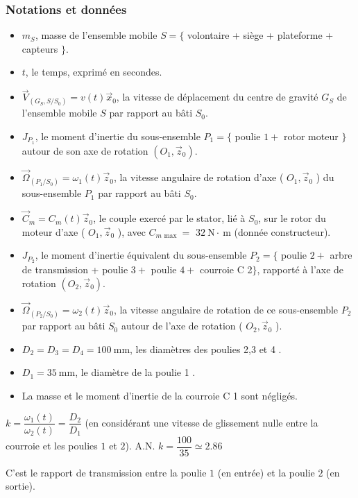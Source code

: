 \subsubsection*{Notations et données}
\begin{itemize}
  \item $m_{S}$, masse de l'ensemble mobile $S=\{$ volontaire + siège + plateforme + capteurs $\}$.
  \item $t$, le temps, exprimé en secondes.
  \item $\vec{V}_{\left(G_{S}, S / S_{0}\right)}=v(t) \vec{x}_{0}$, la vitesse de déplacement du centre de gravité $G_{S}$ de l'ensemble mobile $S$ par rapport au bâti $S_{0}$.
  \item $J_{P_{1}}$, le moment d'inertie du sous-ensemble $P_{1}=\{$ poulie $1+$ rotor moteur $\}$ autour de son axe de rotation $\left(O_{1}, \vec{z}_{0}\right)$.
  \item $\vec{\Omega}_{\left(P_{1} / S_{0}\right)}=\omega_{1}(t) \vec{z}_{0}$, la vitesse angulaire de rotation d'axe ( $O_{1}, \vec{z}_{0}$ ) du sous-ensemble $P_{1}$ par rapport au bâti $S_{0}$.
  \item $\vec{C}_{m}=C_{m}(t) \vec{z}_{0}$, le couple exercé par le stator, lié à $S_{0}$, sur le rotor du moteur d'axe ( $O_{1}, \vec{z}_{0}$ ), avec $C_{m \text { max }}=$ $32 \mathrm{~N} \cdot \mathrm{~m}$ (donnée constructeur).
  \item $J_{P_{2}}$, le moment d'inertie équivalent du sous-ensemble $P_{2}=\{$ poulie $2+$ arbre de transmission + poulie $3+$ poulie $4+$ courroie C 2$\}$, rapporté à l'axe de rotation $\left(O_{2}, \vec{z}_{0}\right)$.
  \item $\vec{\Omega}_{\left(P_{2} / S_{0}\right)}=\omega_{2}(t) \vec{z}_{0}$, la vitesse angulaire de rotation de ce sous-ensemble $P_{2}$ par rapport au bâti $S_{0}$ autour de l'axe de rotation ( $O_{2}, \vec{z}_{0}$ ).
  \item $D_{2}=D_{3}=D_{4}=100 \mathrm{~mm}$, les diamètres des poulies 2,3 et 4 .
  \item $D_{1}=35 \mathrm{~mm}$, le diamètre de la poulie 1 .
  \item La masse et le moment d'inertie de la courroie C 1 sont négligés.
\end{itemize}
\fi

\ifprof
\begin{corrige}
$ k = \dfrac{\omega_1(t)}{\omega_2(t)} = \dfrac{D_2}{D_1}$ (en considérant une vitesse de glissement nulle entre la courroie et les poulies $1$ et $2$).
A.N. $ k = \dfrac{100}{35} \simeq 2.86$

C'est le rapport de transmission entre la poulie $1$ (en entrée) et la poulie $2$ (en sortie).
\end{corrige}
\else
\fi

